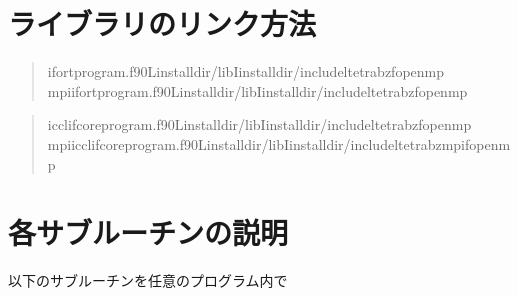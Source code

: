 \documentclass[letterpaper,10pt,dvipdfmx,openany]{sphinxmanual}
\begin{document}
\chapter{ライブラリのリンク方法}
\label{\detokenize{link:id1}}\label{\detokenize{link::doc}}
\sphinxAtStartPar
{}
\begin{quote}

\begin{sphinxVerbatim}[commandchars=\\\{\}]
\PYGZdl{}ifortprogram.f90\PYGZhy{}Linstall\PYGZus{}dir/lib\PYGZhy{}Iinstall\PYGZus{}dir/include\PYGZhy{}ltetrabz\PYGZhy{}fopenmp
\PYGZdl{}mpiifortprogram.f90\PYGZhy{}Linstall\PYGZus{}dir/lib\PYGZhy{}Iinstall\PYGZus{}dir/include\PYGZhy{}ltetrabz\PYGZhy{}fopenmp
\end{sphinxVerbatim}
\end{quote}

\sphinxAtStartPar
{}
\begin{quote}

\begin{sphinxVerbatim}[commandchars=\\\{\}]
\PYGZdl{}icc\PYGZhy{}lifcoreprogram.f90\PYGZhy{}Linstall\PYGZus{}dir/lib\PYGZhy{}Iinstall\PYGZus{}dir/include\PYGZhy{}ltetrabz\PYGZhy{}fopenmp
\PYGZdl{}mpiicc\PYGZhy{}lifcoreprogram.f90\PYGZhy{}Linstall\PYGZus{}dir/lib\PYGZhy{}Iinstall\PYGZus{}dir/include\PYGZhy{}ltetrabz\PYGZus{}mpi\PYGZhy{}fopenmp
\end{sphinxVerbatim}
\end{quote}

\sphinxstepscope


\chapter{各サブルーチンの説明}
\label{\detokenize{routine:id1}}\label{\detokenize{routine::doc}}
\sphinxAtStartPar
以下のサブルーチンを任意のプログラム内で

\begin{sphinxVerbatim}[commandchars=\\\{\}]

\end{sphinxVerbatim}
\end{document}
